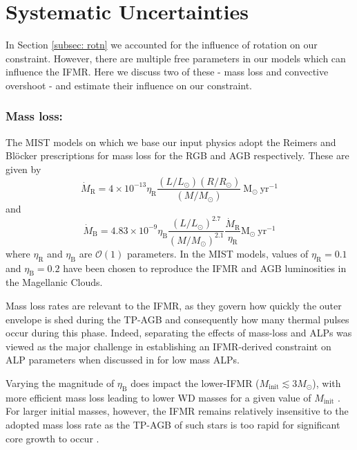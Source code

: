 \section{Systematic Uncertainties}
\label{sec: AppC}
In Section \ref{subsec: rotn} we accounted for the influence of rotation on our constraint. However, there are multiple free parameters in our models which can influence the IFMR. Here we discuss two of these - mass loss and convective overshoot - and estimate their influence on our constraint.

\subsubsection*{Mass loss:}
The MIST models \cite{MIST0, MIST1} on which we base our input physics adopt the Reimers \cite{1975MSRSL...8..369R} and Bl\"{o}cker \cite{1995A&A...297..727B} prescriptions for mass loss for the RGB and AGB respectively. These are given by
\begin{equation}
    \Dot{M}_{\mathrm{R}}=4\times10^{-13}\eta_{\mathrm{R}}\frac{(L/L_{\odot})(R/R_{\odot})}{(M/M_{\odot})}\ \mathrm{M}_{\odot}\ \mathrm{yr}^{-1}
    \label{eq: Reimers}
\end{equation}
and
\begin{equation}
    \Dot{M}_{\mathrm{B}}=4.83\times10^{-9}\eta_{\mathrm{B}}\frac{(L/L_{\odot})^{2.7}}{(M/M_{\odot})^{2.1}}\frac{\Dot{M}_{\mathrm{R}}}{\eta_{\mathrm{R}}} \mathrm{M}_{\odot}\ \mathrm{yr}^{-1}
    \label{eq: Blocker}
\end{equation}
where $\eta_{\mathrm{R}}$ and $\eta_{\mathrm{B}}$ are $\mathcal{O}(1)$ parameters. In the MIST models, values of $\eta_{\mathrm{R}}=0.1$ and $\eta_{\mathrm{B}}=0.2$ have been chosen to reproduce the IFMR and AGB luminosities in the Magellanic Clouds.

Mass loss rates are relevant to the IFMR, as they govern how quickly the outer envelope is shed during the TP-AGB and consequently how many thermal pulses occur during this phase. Indeed, separating the effects of mass-loss and ALPs was viewed as the major challenge in establishing an IFMR-derived constraint on ALP parameters when discussed in \cite{Dominguez} for low mass ALPs.


Varying the magnitude of  $\eta_{\mathrm{B}}$ does impact the lower-IFMR ($M_{\mathrm{init}}\lesssim3M_{\odot}$), with more efficient mass loss leading to lower WD masses for a given value of $M_{\mathrm{init}}$ \cite{Cummings_2019}. For larger initial masses, however, the IFMR remains relatively insensitive to the adopted mass loss rate as the TP-AGB of such stars is too rapid for significant core growth to occur \cite{1995A&A...297..727B}.



